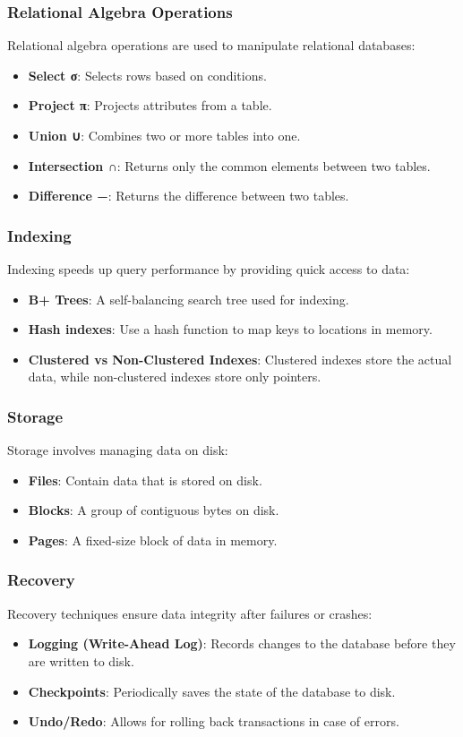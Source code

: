 \documentclass[11pt,letterpaper]{article}
\begin{document}
\subsubsection*{Relational Algebra Operations}
Relational algebra operations are used to manipulate relational databases:
\begin{itemize}
  \item \textbf{Select σ}: Selects rows based on conditions.
  \item \textbf{Project π}: Projects attributes from a table.
  \item \textbf{Union ∪}: Combines two or more tables into one.
  \item \textbf{Intersection ∩}: Returns only the common elements between two tables.
  \item \textbf{Difference −}: Returns the difference between two tables.
\end{itemize}

\subsubsection*{Indexing}
Indexing speeds up query performance by providing quick access to data:
\begin{itemize}
  \item \textbf{B+ Trees}: A self-balancing search tree used for indexing.
  \item \textbf{Hash indexes}: Use a hash function to map keys to locations in memory.
  \item \textbf{Clustered vs Non-Clustered Indexes}: Clustered indexes store the actual data, while non-clustered indexes store only pointers.
\end{itemize}

\subsubsection*{Storage}
Storage involves managing data on disk:
\begin{itemize}
  \item \textbf{Files}: Contain data that is stored on disk.
  \item \textbf{Blocks}: A group of contiguous bytes on disk.
  \item \textbf{Pages}: A fixed-size block of data in memory.
\end{itemize}

\subsubsection*{Recovery}
Recovery techniques ensure data integrity after failures or crashes:
\begin{itemize}
  \item \textbf{Logging (Write-Ahead Log)}: Records changes to the database before they are written to disk.
  \item \textbf{Checkpoints}: Periodically saves the state of the database to disk.
  \item \textbf{Undo/Redo}: Allows for rolling back transactions in case of errors.
\end{itemize}
\end{document}
